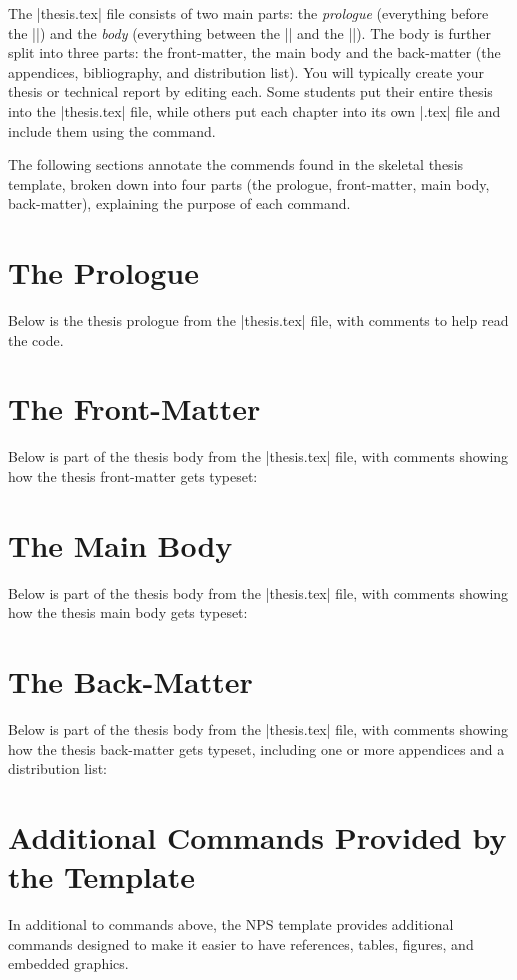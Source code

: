 The |thesis.tex| file consists of two main parts: the
\emph{prologue} (everything before the ||) and the
\emph{body} (everything between the || and the
||). The body is further split into three parts: the front-matter,
the main body and the back-matter (the appendices, bibliography, and
distribution list). You will typically create your thesis or technical
report by editing
each. Some students put their entire thesis into the |thesis.tex|
file, while others put each chapter into its own |.tex| file and
include them using the \verb|| command.

The following sections annotate the commends found in the skeletal thesis template,
broken down into four parts (the prologue, front-matter, main body, back-matter), 
explaining the purpose of each command.


\section{The Prologue}\label{sec:prologue}
Below is the thesis prologue from the |thesis.tex| file, with comments to help read the code.



\section{The Front-Matter}\label{sec:front}
Below is part of the thesis body from the |thesis.tex| file, with comments showing how
the thesis front-matter gets typeset:



\section{The Main Body}\label{sec:main}
Below is part of the thesis body from the |thesis.tex| file, with comments showing how
the thesis main body gets typeset:



\section{The Back-Matter}\label{sec:back}
Below is part of the thesis body from the |thesis.tex| file, with comments showing how
the thesis back-matter gets typeset, including
one or more appendices and a distribution list:



\section{Additional Commands Provided by the Template}
In additional to commands above, the NPS template provides additional
commands designed to make it easier to have references, tables,
figures, and embedded graphics.
